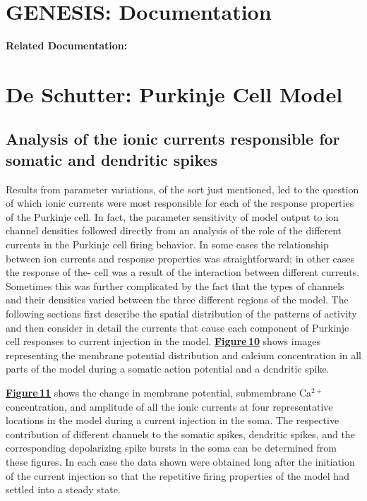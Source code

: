 \documentclass[12pt]{article}
\begin{document}
\section*{GENESIS: Documentation}

{\bf Related Documentation:}

\section*{De Schutter: Purkinje Cell Model}

\subsection*{Analysis of the ionic currents responsible for somatic and dendritic spikes}

Results from parameter variations, of the sort just mentioned,
led to the question of which ionic currents were
most responsible for each of the response properties of the
Purkinje cell. In fact, the parameter sensitivity of model
output to ion channel densities followed directly from an
analysis of the role of the different currents in the Purkinje
cell firing behavior. In some cases the relationship between
ion currents and response properties was straightforward;
in other cases the response of the- cell was a result of the
interaction between different currents. Sometimes this was
further complicated by the fact that the types of channels
and their densities varied between the three different regions
of the model. The following sections first describe the
spatial distribution of the patterns of activity and then consider
in detail the currents that cause each component of
Purkinje cell responses to current injection in the model.
\href{../pub-purkinje-deschutter1-analysis-vm1/pub-purkinje-deschutter1-analysis-vm1.tex}{\bf Figure\,10} shows images representing the membrane potential
distribution and calcium concentration in all parts
of the model during a somatic action potential and a dcndritic
spike.

\href{../pub-purkinje-deschutter1-fig-11/pub-purkinje-deschutter1-fig-11.tex}{\bf Figure\,11} shows the change in membrane potential,
submembrane Ca$^{2+}$ concentration, and amplitude
of all the ionic currents at four representative locations in
the model during a current injection in the soma. The respective
contribution of different channels to the somatic
spikes, dendritic spikes, and the corresponding depolarizing
spike bursts in the soma can be determined from these figures.
In each case the data shown were obtained long after
the initiation of the current injection so that the repetitive
firing properties of the model had settled into a steady state.



\end{document}
